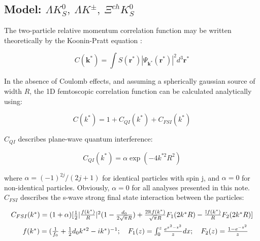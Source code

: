 \documentclass[../AnalysisNoteJBuxton.tex]{subfiles}
\begin{document}
\subsection{Model: \texorpdfstring{$\Lambda K^{0}_{S},~ \Lambda K^{\pm},~ \Xi^{ch}K^{0}_{S}$}{TEXT}}
\label{ModelLambdaKaon}

The two-particle relative momentum correlation function may be written theoretically by the Koonin-Pratt equation \cite{Koonin:1977fh, Pratt:1990zq}:

\begin{equation}
 C(\mathbf{k^{*}}) = \int S(\mathbf{r^{*}})|\Psi_{\mathbf{k^{*}}}(\mathbf{r^{*}})|^{2}d^{3}\mathbf{r^{*}}
\label{eqn:KooninPrattEqn}
\end{equation}

In the absence of Coulomb effects, and assuming a spherically gaussian source of width $R$, the 1D femtoscopic correlation function can be calculated analytically using:

\begin{equation}
 C(k^{*}) = 1 + C_{QI}(k^{*}) + C_{FSI}(k^{*})
\label{eqn:LednickyEqn}
\end{equation}

$C_{QI}$ describes plane-wave quantum interference:

\begin{equation}
 C_{QI}(k^{*}) = \alpha\exp(-4k^{*2}R^{2})
\label{eqn:CQI}
\end{equation}

where $\alpha = (-1)^{2j}/(2j+1)$ for identical particles with spin j, and $\alpha = 0$ for non-identical particles.  Obviously, $\alpha = 0$ for all analyses presented in this note.  $C_{FSI}$ describes the s-wave strong final state interaction between the particles:

\begin{equation}
\begin{array}{l}
\vspace{2mm}  %
  C_{FSI}(k^{*}) = (1+\alpha)[\frac{1}{2}|\frac{f(k^{*})}{R}|^2(1-\frac{d_{0}}{2\sqrt{\pi}R})+\frac{2\mathbb{R}f(k^{*})}{\sqrt{\pi}R}F_{1}(2k^{*}R)-\frac{\mathbb{I}f(k^{*})}{R}F_{2}(2k^{*}R)] \\
\vspace{2mm}  %
  ~~~~~f(k^{*}) = (\frac{1}{f_{0}}+\frac{1}{2}d_{0}k^{*2}-ik^{*})^{-1};~~~
  F_{1}(z) = \int_{0}^{z} \frac{e^{x^{2}-z^{2}}}{z}dx;~~~
  F_{2}(z) = \frac{1-e^{-z^{2}}}{z}
\end{array}  
\label{eqn:CFSI}
\end{equation}
\end{document}
